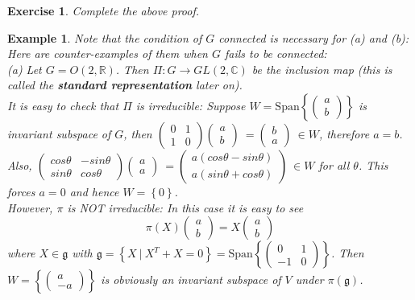 \documentclass[11pt]{article}
\newtheorem{example}[theorem]{Example}
\newtheorem{exercise}[theorem]{Exercise}
\newcommand{\bb}[1]{\mathbb{#1}}
\newcommand{\mf}[1]{\mathfrak{#1}}
\begin{document}
\begin{exercise}
Complete the above proof.
\end{exercise}
\begin{example}
Note that the condition of $G$ connected is necessary for (a) and (b): Here are counter-examples of them when $G$ fails to be connected:\\
(a) Let $G = O(2,\bb{R})$. Then $\Pi: G \to GL(2,\bb{C})$ be the inclusion map (this is called the \textbf{standard representation} later on).\\
It is easy to check that $\Pi$ is irreducible: Suppose $W = \mathrm{Span}\left\{\left( \begin{array}{c}
a \\
b \end{array} \right)\right\}$ is invariant subspace of $G$, then $\left( \begin{array}{cc}
0 & 1 \\
1 & 0 \end{array} \right) \left( \begin{array}{c}
a \\
b \end{array} \right)\ = \left( \begin{array}{c}
b \\
a \end{array} \right)\ \in W$, therefore $a = b$. Also, $\left( \begin{array}{cc}
cos \theta & -sin \theta \\
sin \theta & cos \theta \end{array} \right) \left( \begin{array}{c}
a \\
a \end{array} \right)\ = \left( \begin{array}{c}
a(cos \theta - sin \theta) \\
a(sin \theta + cos \theta) \end{array} \right)\ \in W$ for all $\theta$. This forces $a = 0$ and hence $W = \left\{0\right\}$.\\
However, $\pi$ is NOT irreducible: In this case it is easy to see
$$\pi(X)\left( \begin{array}{c}
a \\
b \end{array} \right)  = X\left( \begin{array}{c}
a \\
b \end{array} \right)$$
where $X \in \mf{g}$ with $\mf{g} = \left\{X\ \Big|\ X^T + X = 0\right\} = \mathrm{Span}\left\{\left( \begin{array}{cc}
0 & 1 \\
-1 & 0  \end{array} \right) \right\}$. Then $W = \left\{ \left( \begin{array}{c}
a \\
-a \end{array} \right) \right\}$ is obviously an invariant subspace of $V$ under $\pi(\mf{g})$.\\


\end{example}
\end{document}

